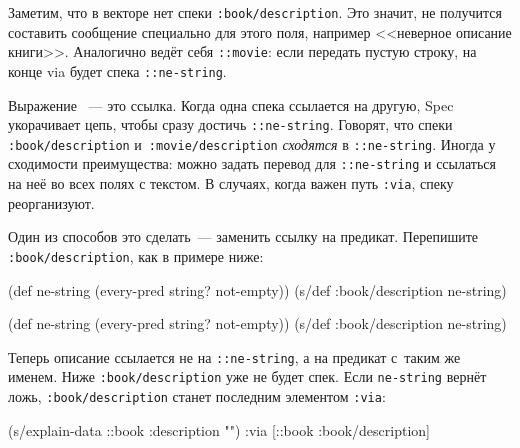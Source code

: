 \fi

Заметим, что в векторе нет спеки \verb|:book/description|. Это значит, не
получится составить сообщение специально для этого поля, например <<неверное
описание книги>>. Аналогично ведёт себя \verb|::movie|: если передать
пустую строку, на конце via будет спека \verb|::ne-string|.

Выражение ~--- это
ссылка. Когда одна спека ссылается на другую, Spec укорачивает цепь, чтобы сразу
достичь \verb|::ne-string|. Говорят, что спеки \verb|:book/description|
и~\verb|:movie/description| \emph{сходятся} в \verb|::ne-string|. Иногда у
сходимости преимущества: можно задать перевод для \verb|::ne-string| и ссылаться
на неё во всех полях с текстом. В случаях, когда важен путь \verb|:via|, спеку
реорганизуют.

Один из способов это сделать~--- заменить ссылку на предикат. Перепишите
\verb|:book/description|, как в примере ниже:

\ifx\devicetype\mobile

\begin{english}
  \begin{clojure}
(def ne-string
  (every-pred string? not-empty))
(s/def :book/description ne-string)
  \end{clojure}
\end{english}

\else

\begin{english}
  \begin{clojure}
(def ne-string (every-pred string? not-empty))
(s/def :book/description ne-string)
  \end{clojure}
\end{english}

\fi

Теперь описание ссылается не на \verb|::ne-string|, а на предикат с~таким же
именем. Ниже \verb|:book/description| уже не будет спек. Если
\verb|ne-string| вернёт ложь, \verb|:book/description| станет последним
элементом \verb|:via|:

\ifx\devicetype\mobile

\begin{english}
  \begin{clojure}
(s/explain-data ::book
  {:description ""})
{:via [::book :book/description]}
  \end{clojure}
\end{english}

\else

